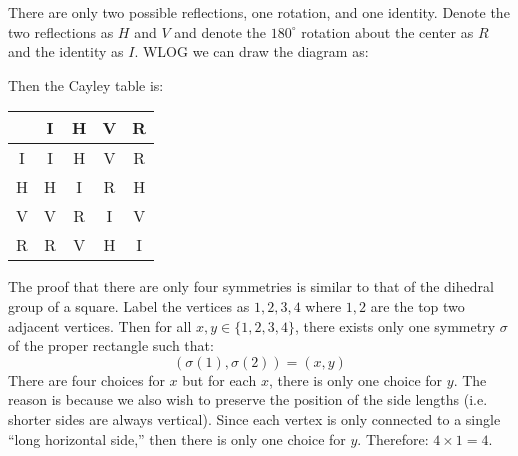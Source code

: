 \begin{sol}
    There are only two possible reflections, one rotation, and one identity. Denote the two reflections as $H$ and $V$ and denote the $180^\circ$ rotation about the center as $R$ and the identity as $I$. WLOG we can draw the diagram as:
    \begin{center}
    \end{center}
    Then the Cayley table is:
    \begin{center}
        \begin{tabular}{c|cccc}
            \cline{2-5}
            & \multicolumn{1}{c|}{I} & \multicolumn{1}{c|}{H} & \multicolumn{1}{c|}{V} & \multicolumn{1}{c|}{R} \\ \hline
            \multicolumn{1}{|c|}{I} &I&H&V&R\\ \cline{1-1}
            \multicolumn{1}{|c|}{H} &H&I&R&H\\ \cline{1-1}
            \multicolumn{1}{|c|}{V} &V&R&I&V\\ \cline{1-1}
            \multicolumn{1}{|c|}{R} &R&V&H&I\\ \cline{1-1}
        \end{tabular}
    \end{center}
    The proof that there are only four symmetries is similar to that of the dihedral group of a square. Label the vertices as $1,2,3,4$ where $1,2$ are the top two adjacent vertices. Then for all $x,y \in \{1,2,3,4\}$, there exists only one symmetry $\sigma$ of the proper rectangle such that:
    \begin{equation}
        (\sigma(1), \sigma(2)) = (x,y)
    \end{equation}
    There are four choices for $x$ but for each $x$, there is only one choice for $y$. The reason is because we also wish to preserve the position of the side lengths (i.e. shorter sides are always vertical). Since each vertex is only connected to a single ``long horizontal side,'' then there is only one choice for $y$. Therefore: $4\times 1=4$.
\end{sol}
